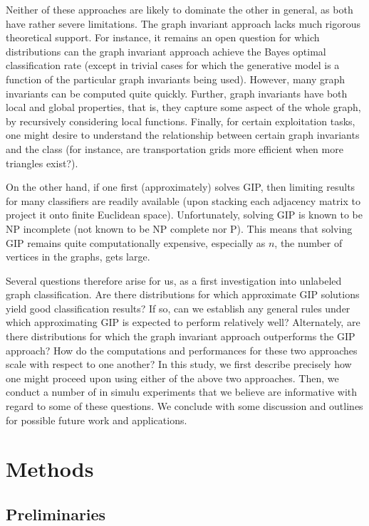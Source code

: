 Neither of these approaches are likely to dominate the other in general, as both have rather severe limitations.  The graph invariant approach lacks much rigorous theoretical support.  For instance, it remains an open question for which distributions can the graph invariant approach achieve the Bayes optimal classification rate (except in trivial cases for which the generative model is a function of the particular graph invariants being used). However, many graph invariants can be computed quite quickly.  Further, graph invariants have both local and global properties, that is, they capture some aspect of the whole graph, by recursively considering local functions.  Finally, for certain exploitation tasks, one might desire to understand the relationship between certain graph invariants and the class (for instance, are transportation grids more efficient when more triangles exist?).  

On the other hand, if one first (approximately) solves GIP, then limiting results for many classifiers are readily available (upon stacking each adjacency matrix to project it onto finite Euclidean space).  Unfortunately, solving GIP is known to be NP incomplete \cite{??} (not known to be NP complete nor P).   This means that solving GIP remains quite computationally expensive, especially as $n$, the number of vertices in the graphs, gets large.

Several questions therefore arise for us, as a first investigation into unlabeled graph classification.  Are there distributions for which approximate GIP solutions yield good classification results? If so, can we establish any general rules under which approximating GIP is expected to perform relatively well?  Alternately, are there distributions for which the graph invariant approach outperforms the GIP approach?  How do the computations and performances for these two approaches scale with respect to one another?  In this study, we first describe precisely how one might proceed upon using either of the above two approaches.  Then, we conduct a number of in simulu experiments that we believe are informative with regard to some of these questions.  We conclude with some discussion and outlines for possible future work and applications.

\section{Methods} %
\label{sec:methods}

\subsection{Preliminaries} %
\label{sub:nomenclature}

